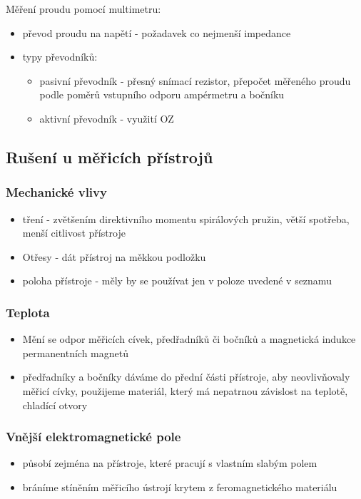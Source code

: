 Měření proudu pomocí multimetru:
\begin{itemize}
    \item převod proudu na napětí - požadavek co nejmenší impedance
    \item typy převodníků:
          \begin{itemize}
              \item pasivní převodník - přesný snímací rezistor, přepočet měřeného proudu podle
                    poměrů vstupního odporu ampérmetru a bočníku
              \item aktivní převodník - využití OZ
          \end{itemize}
\end{itemize}

\subsection*{Rušení u měřicích přístrojů}
\subsubsection*{Mechanické vlivy}
\begin{itemize}
    \item tření - zvětšením direktivního momentu spirálových pružin, větší spotřeba,
          menší citlivost přístroje
    \item Otřesy - dát přístroj na měkkou podložku
    \item poloha přístroje - měly by se používat jen v poloze uvedené v seznamu
\end{itemize}

\subsubsection*{Teplota}
\begin{itemize}
    \item Mění se odpor měřicích cívek, předřadníků či bočníků a magnetická indukce
          permanentních magnetů
    \item předřadníky a bočníky dáváme do přední části přístroje, aby neovlivňovaly
          měřicí cívky, použijeme materiál, který má nepatrnou závislost na teplotě,
          chladící otvory
\end{itemize}
\subsubsection*{Vnější elektromagnetické pole}
\begin{itemize}
    \item působí zejména na přístroje, které pracují s vlastním slabým polem
    \item bráníme stíněním měřicího ústrojí krytem z feromagnetického materiálu
\end{itemize}

